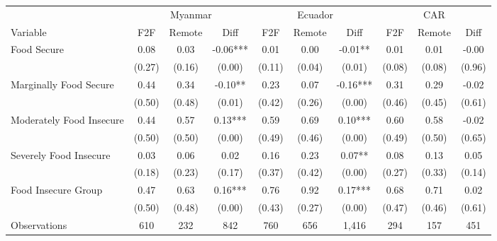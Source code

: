\begin{tabular}{l*{9}c}
\hline\hline
 & \multicolumn{3}{c}{Myanmar} & \multicolumn{3}{c}{Ecuador} & \multicolumn{3}{c}{CAR}\\ 
Variable & F2F & Remote & Diff & F2F & Remote & Diff & F2F & Remote & Diff \\
\hline
Food Secure&0.08&0.03&-0.06***&0.01&0.00&-0.01**&0.01&0.01&-0.00\\
&(0.27)&(0.16)&(0.00)&(0.11)&(0.04)&(0.01)&(0.08)&(0.08)&(0.96)\\
Marginally Food Secure&0.44&0.34&-0.10**&0.23&0.07&-0.16***&0.31&0.29&-0.02\\
&(0.50)&(0.48)&(0.01)&(0.42)&(0.26)&(0.00)&(0.46)&(0.45)&(0.61)\\
Moderately Food Insecure&0.44&0.57&0.13***&0.59&0.69&0.10***&0.60&0.58&-0.02\\
&(0.50)&(0.50)&(0.00)&(0.49)&(0.46)&(0.00)&(0.49)&(0.50)&(0.65)\\
Severely Food Insecure&0.03&0.06&0.02&0.16&0.23&0.07**&0.08&0.13&0.05\\
&(0.18)&(0.23)&(0.17)&(0.37)&(0.42)&(0.00)&(0.27)&(0.33)&(0.14)\\
Food Insecure Group&0.47&0.63&0.16***&0.76&0.92&0.17***&0.68&0.71&0.02\\
&(0.50)&(0.48)&(0.00)&(0.43)&(0.27)&(0.00)&(0.47)&(0.46)&(0.61)\\
\hline
Observations & 610 & 232 & 842 & 760 & 656 & 1,416 & 294 & 157 & 451 \\
\hline\hline
\end{tabular}
